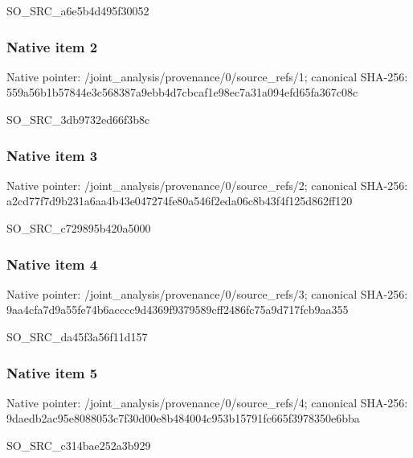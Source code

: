 \documentclass[10pt,a4paper]{article}
\begin{document}
\begingroup\raggedright\sloppy SO\_\allowbreak{}SRC\_\allowbreak{}a6e5b4d495f30052\par\endgroup

\subsubsection{Native item 2}
Native pointer: /joint\_\allowbreak{}analysis/provenance/0/source\_\allowbreak{}refs/1; canonical SHA-256: 559a56b1b57844e3c568387a9ebb4d7cbcaf1e98ec7a31a094efd65fa367c08c

\begingroup\raggedright\sloppy SO\_\allowbreak{}SRC\_\allowbreak{}3db9732ed66f3b8c\par\endgroup

\subsubsection{Native item 3}
Native pointer: /joint\_\allowbreak{}analysis/provenance/0/source\_\allowbreak{}refs/2; canonical SHA-256: a2cd77f7d9b231a6aa4b43e047274fe80a546f2eda06c8b43f4f125d862ff120

\begingroup\raggedright\sloppy SO\_\allowbreak{}SRC\_\allowbreak{}c729895b420a5000\par\endgroup

\subsubsection{Native item 4}
Native pointer: /joint\_\allowbreak{}analysis/provenance/0/source\_\allowbreak{}refs/3; canonical SHA-256: 9aa4cfa7d9a55fe74b6acccc9d4369f9379589cff2486fc75a9d717fcb9aa355

\begingroup\raggedright\sloppy SO\_\allowbreak{}SRC\_\allowbreak{}da45f3a56f11d157\par\endgroup

\subsubsection{Native item 5}
Native pointer: /joint\_\allowbreak{}analysis/provenance/0/source\_\allowbreak{}refs/4; canonical SHA-256: 9daedb2ac95e8088053c7f30d00e8b484004c953b15791fc665f3978350e6bba

\begingroup\raggedright\sloppy SO\_\allowbreak{}SRC\_\allowbreak{}c314bae252a3b929\par\endgroup
\end{document}
